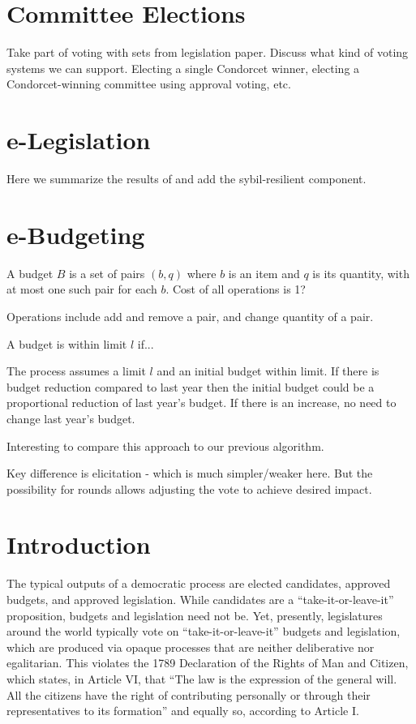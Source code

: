 \documentclass[sigconf]{aamas}  %
\begin{document}
\section{Committee Elections}

Take part of voting with sets from legislation paper.
Discuss what kind of voting systems we can support.
Electing a single Condorcet winner, electing a Condorcet-winning committee using approval voting, etc.

\section{e-Legislation}

Here we summarize the results of \cite{legislation} and add the sybil-resilient component.

\section{e-Budgeting}

A budget $B$ is a set of pairs $(b,q)$ where $b$ is an item and $q$ is its quantity, with at most one such pair for each $b$.
Cost of all operations is 1?

Operations include add and remove a pair, and change quantity of a pair.

A budget is within limit $l$ if...

The process assumes a limit $l$ and an initial budget within limit. If there is budget reduction compared to last year then the initial budget could be a proportional reduction of last year's budget.  If there is an increase, no need to change last year's budget.

Interesting to compare this approach to our previous algorithm.

Key difference is elicitation - which is much simpler/weaker here.
But the possibility for rounds allows adjusting the vote to achieve desired impact.



\pagebreak
\pagebreak


\section{Introduction}\label{section:introduction}


The typical outputs of a democratic process are elected candidates, approved budgets, and approved legislation.  While candidates are a ``take-it-or-leave-it'' proposition, budgets and legislation need not be. Yet, presently, legislatures around the world typically vote on ``take-it-or-leave-it'' budgets and legislation, which are produced via opaque processes that are neither deliberative nor egalitarian.  This violates the 1789 Declaration of the Rights of Man and Citizen, which states, in Article VI, that ``The law is the expression of the general will. All the citizens have the right of contributing personally or through their representatives to its formation'' and equally so, according to Article I.
\end{document}

